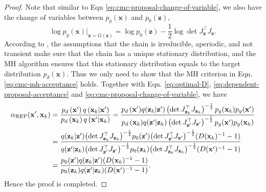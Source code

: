\documentclass[runningheads]{llncs}
\newcommand{\bx}{\mathbf{x}}
\newcommand{\bz}{\mathbf{z}}
\newcommand{\<}{\left\langle}
\renewcommand{\>}{\right\rangle}
\begin{document}
\begin{proof}
Note that similar to Eqn \eqref{eq:cmc-proposal-change-of-variable},  we also have the change of variables between $p_g(\bx)$ and $p_0(\bz)$,
\begin{equation}
\log p_g(\bx)\rvert_{\bx=G(\bz)}=\log p_0(\bz) - \frac{1}{2} \log \det J_{\bz}^\top J_{\bz}.
\label{eq:generator-change-of-variable}
\end{equation}
According to \cite{gelman2013bayesian}, the assumptions that the chain is irreducible, aperiodic, and not transient make sure that the chain has a unique stationary distribution, and the MH algorithm ensures that this stationary distribution equals to the target distribution $p_d(\bx)$.
Thus we only need to show that the MH criterion in Eqn. \eqref{eq:cmc-mh-acceptance} holds. Together with Eqn. \eqref{eq:optimal-D}, \eqref{eq:dependent-proposal-acceptance} and \eqref{eq:cmc-proposal-change-of-variable}, we have
\begin{equation}
\begin{aligned}
\alpha_{\rm REP}(\bx',\bx_k)
&=\frac{p_d\left(\mathbf{x}^{\prime}\right)  q\left(\mathbf{x}_{k}|\bx'\right)}{p_d\left(\mathbf{x}_{k}\right)  q\left(\mathbf{x}^{\prime}|\bx_k\right)}
=\frac{{p_d\left(\mathbf{x}^{\prime}\right)}  q(\bz_k|\bz')
\left(\det J_{\bz_k}^\top J_{\bz_k}\right)^{-\frac{1}{2}}
{p_g(\bx_k)}p_g(\bx')}{{p_d\left(\mathbf{x}_{k}\right)}  q(\bz'|\bz_k)
\left(\det J_{\bz'}^\top J_{\bz'}\right)^{-\frac{1}{2}}
{p_g(\bx')}p_g(\bx_k)}\\
&=\frac{q(\bz_k|\bz'){\left(\det J_{\bz_k}^\top J_{\bz_k}\right)^{-\frac{1}{2}}}p_0(\bz'){\left(\det J_{\bz'}^\top J_{\bz'}\right)^{-\frac{1}{2}}}(D(\bx_k)^{-1}-1)}
{q(\bz'|\bz_k){\left(\det J_{\bz'}^\top J_{\bz'}\right)^{-\frac{1}{2}}}p_0(\bz_k){\left(\det J_{\bz_k}^\top J_{\bz_k}\right)^{-\frac{1}{2}}}(D(\bx')^{-1}-1)}\\
&=\frac{p_0(\bz')q(\bz_k|\bz')(D(\bx_k)^{-1}-1)}{p_0(\bz_k)q(\bz'|\bz_k)(D(\bx')^{-1}-1)}.
\end{aligned}
\label{eq:dcgan-cmc-alpha}
\end{equation}
Hence the proof is completed.
\end{proof}
\end{document}
